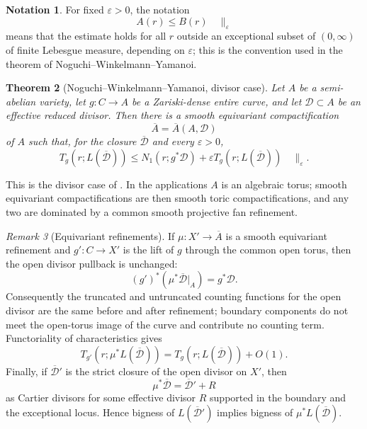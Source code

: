 \documentclass[11pt]{amsart}
\def\CC{C}%
\numberwithin{equation}{section}
\newtheorem{theorem}{Theorem}[section]
\theoremstyle{definition}
\newtheorem{notation}[theorem]{Notation}
\theoremstyle{remark}
\newtheorem{remark}[theorem]{Remark}
\newcommand{\CC}{\mathbb C}
\begin{document}
\begin{notation}\label{not:epsilon-exception}
For fixed $\varepsilon>0$, the notation
\[
A(r)\le B(r)\quad \|_\varepsilon
\]
means that the estimate holds for all $r$ outside an exceptional subset of $(0,\infty)$ of finite Lebesgue measure, depending on $\varepsilon$; this is the convention used in the theorem of Noguchi--Winkelmann--Yamanoi.
\end{notation}

\begin{theorem}[Noguchi--Winkelmann--Yamanoi, divisor case]\label{thm:nwy-input}
Let $A$ be a semi-abelian variety, let $g:\CC\to A$ be a Zariski-dense entire curve, and let $\mathcal D\subset A$ be an effective reduced divisor. Then there is a smooth equivariant compactification
\[
\overline A=\overline A(A,\mathcal D)
\]
of $A$ such that, for the closure $\overline{\mathcal D}$ and every $\varepsilon>0$,
\begin{equation}\label{eq:nwy-inequality}
T_g(r;L(\overline{\mathcal D}))\le N_1(r;g^*\mathcal D)+\varepsilon T_g(r;L(\overline{\mathcal D}))\quad\|_\varepsilon.
\end{equation}
\end{theorem}

This is the divisor case of \cite[Main Theorem~(iii)]{NoguchiWinkelmannYamanoi2008SMTII}.  In the applications $A$ is an algebraic torus; smooth equivariant compactifications are then smooth toric compactifications, and any two are dominated by a common smooth projective fan refinement.

\begin{remark}[Equivariant refinements]\label{rem:equivariant-refinement}
If $\mu:X'\to\overline A$ is a smooth equivariant refinement and $g':\CC\to X'$ is the lift of $g$ through the common open torus, then the open divisor pullback is unchanged:
\[
(g')^*(\mu^*\overline{\mathcal D}|_A)=g^*\mathcal D.
\]
Consequently the truncated and untruncated counting functions for the open divisor are the same before and after refinement; boundary components do not meet the open-torus image of the curve and contribute no counting term.  Functoriality of characteristics gives
\[
T_{g'}(r;\mu^*L(\overline{\mathcal D}))=T_g(r;L(\overline{\mathcal D}))+O(1).
\]
Finally, if $\overline{\mathcal D}'$ is the strict closure of the open divisor on $X'$, then
\[
\mu^*\overline{\mathcal D}=\overline{\mathcal D}'+R
\]
as Cartier divisors for some effective divisor $R$ supported in the boundary and the exceptional locus.  Hence bigness of $L(\overline{\mathcal D}')$ implies bigness of $\mu^*L(\overline{\mathcal D})$.
\end{remark}
\end{document}

